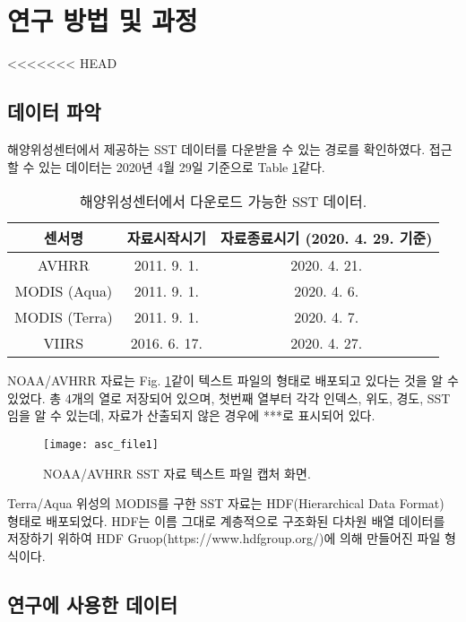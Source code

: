 \section{연구 방법 및 과정}

<<<<<<< HEAD
\subsection{데이터 파악}

해양위성센터에서 제공하는 SST 데이터를 다운받을 수 있는 경로를 확인하였다. 접근할 수 있는 데이터는 2020년 4월 29일 기준으로 Table \ref{table:KOSC-SST-data}\와 같다.


\begin{table}[!htbp]
	\caption{해양위성센터에서 다운로드 가능한 SST 데이터.}
	\begin{tabular}{c|c|c}
		\toprule
		센서명           & 자료시작시기       & 자료종료시기 (2020. 4. 29. 기준) \\ \toprule
		AVHRR         & 2011. 9. 1.  & 2020. 4. 21.          \\ \hline
		MODIS (Aqua)  & 2011. 9. 1.  & 2020. 4. 6.           \\ \hline
		MODIS (Terra) & 2011. 9. 1.  & 2020. 4. 7.           \\ \hline
		VIIRS         & 2016. 6. 17. & 2020. 4. 27.          \\ \bottomrule
	\end{tabular}

	\label{table:KOSC-SST-data}
\end{table}

NOAA/AVHRR 자료는 Fig. \ref{fig:asc_file}\와 같이 텍스트 파일의 형태로 배포되고 있다는 것을 알 수 있었다. 총 4개의 열로 저장되어 있으며, 첫번째 열부터 각각 인덱스, 위도, 경도, SST 임을 알 수 있는데, 자료가 산출되지 않은 경우에 ***로 표시되어 있다.

\begin{figure}[htbp]
	\centerline{\texttt{[image: asc\_file1]}}
	\caption{NOAA/AVHRR SST 자료 텍스트 파일 캡처 화면.}
	\label{fig:asc_file}
\end{figure}

Terra/Aqua 위성의 MODIS를 구한 SST 자료는 HDF(Hierarchical Data Format) 형태로 배포되었다. HDF는 이름 그대로 계층적으로 구조화된 다차원 배열 데이터를 저장하기 위하여 HDF Gruop(https://www.hdfgroup.org/)에 의해 만들어진 파일 형식이다.

\newpage
\subsection{연구에 사용한 데이터}


